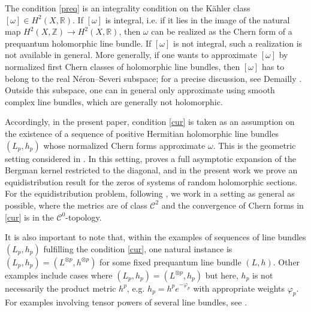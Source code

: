 \documentclass[11pt,leqno,oneside]{amsart}
\numberwithin{equation}{section}
\begin{document}
The condition \eqref{preq} is an integrality condition on the Kähler class $[\omega]\in H^2(X,\mathbb{R})$. If $[\omega]$ is integral, i.e. if it lies in the image of the natural map $H^2(X,\mathbb{Z})\to H^2(X,\mathbb{R})$, then $\omega$ can be realized as the Chern form of a prequantum holomorphic line bundle. If $[\omega]$ is not integral, such a realization is not available in general. More generally, if one wants to approximate $[\omega]$ by normalized first Chern classes of holomorphic line bundles, then $[\omega]$ has to belong to the real Néron--Severi subspace; for a precise discussion, see Demailly \cite{Demailly2010}. Outside this subspace, one can in general only approximate using smooth complex line bundles, which are generally not holomorphic.

Accordingly, in the present paper, condition \eqref{cur} is taken as an assumption on the existence of a sequence of positive Hermitian holomorphic line bundles $(L_p,h_p)$ whose normalized Chern forms approximate $\omega$. This is the geometric setting considered in \cite{CLMM}. In this setting, \cite{CLMM} proves a full asymptotic expansion of the Bergman kernel restricted to the diagonal, and in the present work we prove an equidistribution result for the zeros of systems of random holomorphic sections. For the equidistribution problem, following \cite{CLMM}, we work in a setting as general as possible, where the metrics are of class $\mathscr{C}^{2}$ and the convergence of Chern forms in \eqref{cur} is in the $\mathscr{C}^{0}$-topology.

It is also important to note that, within the examples of sequences of line bundles $(L_{p}, h_{p})$ fulfilling the condition \eqref{cur}, one natural instance is $(L_{p}, h_{p})=(L^{\otimes p},h^{\otimes p})$ for some fixed prequantum line bundle $(L,h)$. Other examples include cases where $(L_{p}, h_{p})=(L^{\otimes p},h_{p})$ but here, $h_{p}$ is not necessarily the product metric $h^{p}$, e.g. $h_{p}=h^{p}e^{-\varphi_{p}}$ with appropriate weights $\varphi_{p}$. For examples involving tensor powers of several line bundles, see \cite{CLMM}.
\end{document}
